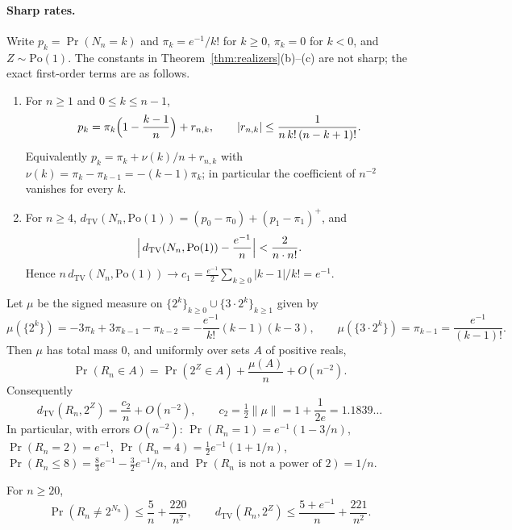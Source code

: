 \paragraph{Sharp rates.}
Write $p_k=\Pr(N_n=k)$ and $\pi_k=e^{-1}/k!$ for $k\ge0$, $\pi_k=0$ for $k<0$, and $Z\sim\mathrm{Po}(1)$. The constants in Theorem~\ref{thm:realizers}(b)--(c) are not sharp; the exact first-order terms are as follows.

\begin{theorem}\label{thm:sharpN}
\begin{enumerate}[label=(\roman*),leftmargin=2em]
\item For $n\ge1$ and $0\le k\le n-1$,
\[
p_k=\pi_k\Bigl(1-\frac{k-1}{n}\Bigr)+r_{n,k},\qquad |r_{n,k}|\le\frac{1}{n\,k!\,(n-k+1)!}.
\]
Equivalently $p_k=\pi_k+\nu(k)/n+r_{n,k}$ with $\nu(k)=\pi_k-\pi_{k-1}=-(k-1)\pi_k$; in particular the coefficient of $n^{-2}$ vanishes for every $k$.
\item For $n\ge4$, $d_{\mathrm{TV}}(N_n,\mathrm{Po}(1))=(p_0-\pi_0)+(p_1-\pi_1)^+$, and
\[
\Bigl|\,d_{\mathrm{TV}}(N_n,\mathrm{Po}(1))-\frac{e^{-1}}{n}\Bigr|<\frac{2}{n\cdot n!}.
\]
Hence $n\,d_{\mathrm{TV}}(N_n,\mathrm{Po}(1))\to c_1=\tfrac{e^{-1}}2\sum_{k\ge0}|k-1|/k!=e^{-1}$.
\end{enumerate}
\end{theorem}

\begin{theorem}\label{thm:sharpR}
Let $\mu$ be the signed measure on $\{2^k\}_{k\ge0}\cup\{3\cdot2^k\}_{k\ge1}$ given by
\[
\mu(\{2^k\})=-3\pi_k+3\pi_{k-1}-\pi_{k-2}=-\frac{e^{-1}}{k!}(k-1)(k-3),\qquad
\mu(\{3\cdot2^k\})=\pi_{k-1}=\frac{e^{-1}}{(k-1)!}.
\]
Then $\mu$ has total mass $0$, and uniformly over sets $A$ of positive reals,
\[
\Pr(R_n\in A)=\Pr(2^Z\in A)+\frac{\mu(A)}{n}+O(n^{-2}).
\]
Consequently
\[
d_{\mathrm{TV}}(R_n,2^Z)=\frac{c_2}{n}+O(n^{-2}),\qquad c_2=\tfrac12\lVert\mu\rVert=1+\frac1{2e}=1.1839\ldots
\]
In particular, with errors $O(n^{-2})$: $\Pr(R_n=1)=e^{-1}(1-3/n)$, $\Pr(R_n=2)=e^{-1}$, $\Pr(R_n=4)=\tfrac12e^{-1}(1+1/n)$, $\Pr(R_n\le8)=\tfrac83e^{-1}-\tfrac32e^{-1}/n$, and $\Pr(R_n\text{ is not a power of }2)=1/n$. 
\end{theorem}

\begin{proposition}\label{prop:sharpexplicit}
For $n\ge20$,
\[
\Pr(R_n\ne2^{N_n})\le\frac5n+\frac{220}{n^2},\qquad
d_{\mathrm{TV}}(R_n,2^Z)\le\frac{5+e^{-1}}{n}+\frac{221}{n^2}.
\]
\end{proposition}

